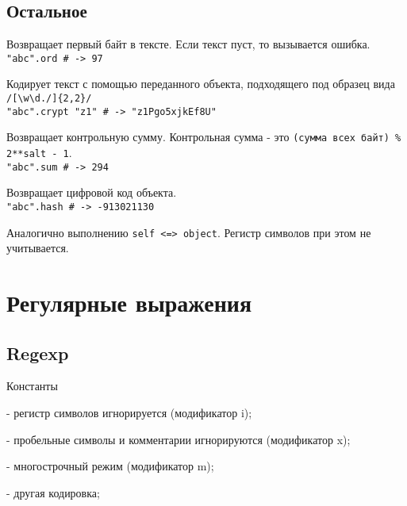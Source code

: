 \subsection*{Остальное}

\begin{methodlist}
  Возвращает первый байт в тексте. Если текст пуст, то вызывается ошибка.
  \\\verb!"abc".ord # -> 97!

  Кодирует текст с помощью переданного объекта, подходящего под образец вида \verb!/[\w\d./]{2,2}/!
  \\\verb!"abc".crypt "z1" # -> "z1Pgo5xjkEf8U"!

  Возвращает контрольную сумму. Контрольная сумма - это \verb!(сумма всех байт) % 2**salt - 1!.
  \\\verb!"abc".sum # -> 294!

  Возвращает цифровой код объекта.  
  \\\verb!"abc".hash # -> -913021130!

  Аналогично выполнению \verb!self <=> object!. Регистр символов при этом не учитывается.
\end{methodlist}

\section{Регулярные выражения}

\subsection{Regexp}

\begin{keylist}{Константы}
  
   - регистр символов игнорируется (модификатор i);
  
   - пробельные символы и комментарии игнорируются (модификатор x);
  
   - многострочный режим (модификатор m);
  
   - другая кодировка;
\end{keylist}

